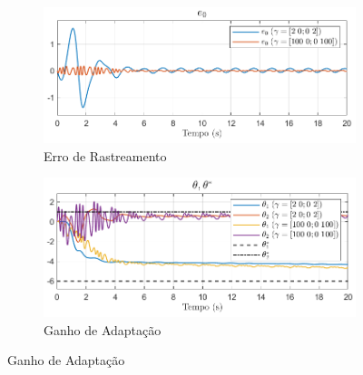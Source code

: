 \documentclass[10pt]{article}
\begin{document}
\begin{figure}[h!]
    \centering
    \begin{subfigure}[b]{0.3\textwidth}
        \centering
        \includegraphics[width=\textwidth]{img/fig06a.png}
        \caption{Erro de Rastreamento}
    \end{subfigure}
    \begin{subfigure}[b]{0.3\textwidth}
        \centering
        \includegraphics[width=\textwidth]{img/fig06b.png}
        \caption{Ganho de Adaptação}
    \end{subfigure}


\end{figure}
\end{document}

